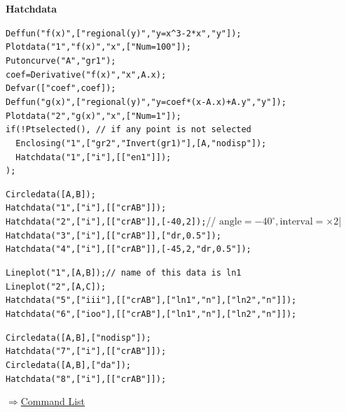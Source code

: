 \documentclass[papersize,a4paper,12pt]{article}
\newenvironment{cmd}[2]{
\hypertarget{#2}{}
\begin{center}{\bf\large #1}\end{center}
\begin{description}
}{
\end{description}
\begin{flushright} \hyperlink{functionlist}{$\Rightarrow$Command List}\end{flushright}
}
\begin{document}
\begin{cmd}{Hatchdata}{hatchdata}
\begin{center}

\end{center}

\verb|Deffun("f(x)",["regional(y)","y=x^3-2*x","y"]);|\\
\verb|Plotdata("1","f(x)","x",["Num=100"]);|\\
\verb|Putoncurve("A","gr1");|\\
\verb|coef=Derivative("f(x)","x",A.x);|\\
\verb|Defvar(["coef",coef]);|\\
\verb|Deffun("g(x)",["regional(y)","y=coef*(x-A.x)+A.y","y"]);|\\
\verb|Plotdata("2","g(x)","x",["Num=1"]);|\\
\verb|if(!Ptselected(), // if any point is not selected|\\
\verb|  Enclosing("1",["gr2","Invert(gr1)"],[A,"nodisp"]);|\\
\verb|  Hatchdata("1",["i"],[["en1"]]);|\\
\verb|);|

\begin{center}

\end{center}

\verb|Circledata([A,B]);|\\
\verb|Hatchdata("1",["i"],[["crAB"]]);|\\
\verb|Hatchdata("2",["i"],[["crAB"]],[-40,2]);|// $\mbox{angle}=-40^{\circ}, \mbox{interval}=\times 2$|\\
\verb|Hatchdata("3",["i"],[["crAB"]],["dr,0.5"]);|\\
\verb|Hatchdata("4",["i"],[["crAB"]],[-45,2,"dr,0.5"]);|

\begin{center}

\end{center}

\verb|Lineplot("1",[A,B]);// name of this data is ln1|\\
\verb|Lineplot("2",[A,C]);|\\
\verb|Hatchdata("5",["iii"],[["crAB"],["ln1","n"],["ln2","n"]]);|\\
\verb|Hatchdata("6",["ioo"],[["crAB"],["ln1","n"],["ln2","n"]]);|

\begin{center}
\hspace{10mm}
\end{center}

\verb|Circledata([A,B],["nodisp"]);|\\
\verb|Hatchdata("7",["i"],[["crAB"]]);|\\
\verb|Circledata([A,B],["da"]);|\\
\verb|Hatchdata("8",["i"],[["crAB"]]);|


\end{cmd}
\end{document}
